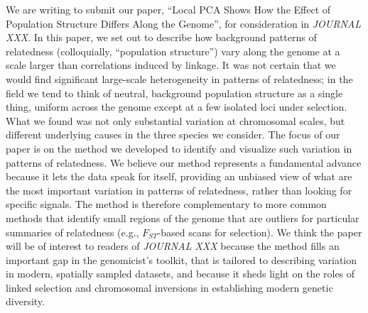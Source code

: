 \documentclass[stdletter,letterpaper,addrfromright,orderfromdateto,dateleft,11pt,noaddrto,sigleft]{newlfm}
\begin{document}
\begin{newlfm}




We are writing to submit our paper,
``Local PCA Shows How the Effect of Population Structure Differs Along the Genome'',
for consideration in \textit{JOURNAL XXX}.
In this paper, we set out to describe how background patterns of relatedness 
(colloquially, ``population structure'')
vary along the genome at a scale larger than correlations induced by linkage.
It was not certain that we would find significant large-scale heterogeneity in patterns of relatedness;
in the field we tend to think of neutral, background population structure as a single thing,
uniform across the genome except at a few isolated loci under selection.
What we found was not only substantial variation at chromosomal scales,
but different underlying causes in the three species we consider.
The focus of our paper is on the method we developed to identify and visualize such variation in patterns of relatedness.
We believe our method represents a fundamental advance because it lets the data speak for itself,
providing an unbiased view of what are the most important variation in patterns of relatedness,
rather than looking for specific signals.
The method is therefore complementary to more common methods that identify small regions of the genome
that are outliers for particular summaries of relatedness (e.g., $F_{ST}$-based scans for selection).
We think the paper will be of interest to readers of \textit{JOURNAL XXX}
because the method fills an important gap in the genomicist's toolkit,
that is tailored to describing variation in modern, spatially sampled datasets,
and because it sheds light on the roles of linked selection and chromosomal inversions in 
establishing modern genetic diversity.


\end{newlfm}
\end{document}
